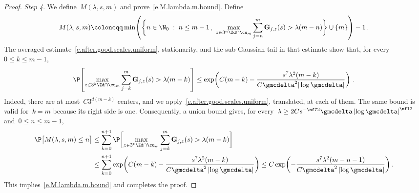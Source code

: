 \documentclass[11pt]{amsart}
\begin{document}
\begin{proof}
\emph{Step 4.} We define~$M(\lambda,s,m)$ and prove~\eqref{e.M.lambda.m.bound}. Define
\begin{align*}
	M(\lambda,s,m)
	\coloneqq
	\min\!\left(
	\biggl\{ n \in \N_0 \; : \;  n \leq m-1\,, \ \max_{z\in3^{n} \Zd \cap \cu_m}
	\sum_{j=n}^{m}
	\mathbf{G}_{j,z}(s)
	>
	\lambda (m-n)
	\biggr\}\cup\{m\}\right)-1
	\,.
\end{align*}
The averaged estimate~\eqref{e.after.good.scales.uniform}, stationarity, and the sub-Gaussian tail in that estimate show that, for every~$0\leq k\leq m-1$,
\begin{equation*}
	\P\!\left[
	\max_{z\in3^k\Zd\cap\cu_m}
	\sum_{j=k}^m\mathbf G_{j,z}(s)>\lambda(m-k)
	\right]
	\leq
	\exp\!\left(
	C(m-k)-\frac{s^7\lambda^2(m-k)}{C\gmcdelta^2|\log\gmcdelta|}
	\right)\,.
\end{equation*}
Indeed, there are at most~$C3^{d(m-k)}$ centers, and we apply~\eqref{e.after.good.scales.uniform}, translated, at each of them. The same bound is valid for~$k=m$ because its right side is one. Consequently, a union bound gives, for every~$\lambda \geq 2 Cs^{-\nf 72}   \gmcdelta \left| \log \gmcdelta \right|^{\nf 12} $ and~$0\leq n\leq m-1$,
\begin{align}
	\P \bigl[ M(\lambda,s,m) \leq n \bigr]
	&
	\leq
	\sum_{k=0}^{n+1}
	\P \biggl[
	\max_{z\in3^k \Zd \cap \cu_m}
	\sum_{j=k}^{m}
	\mathbf{G}_{j,z}(s)
	>
	\lambda (m-k)
	\biggr]
	\notag \\ &
	\leq
	\sum_{k=0}^{n+1}
	\exp \biggl( C (m-k)
	-\frac{s^7 \lambda^2  (m-k) }{C \gmcdelta^{2} \left| \log \gmcdelta \right| }
	\biggr)
	\leq
	C\exp \biggl(
	-\frac{s^7 \lambda^2  (m-n-1) }{C\gmcdelta^{2} \left| \log \gmcdelta \right|}
	\biggr)\,.
	\label{e.M.lambda.m.tail}
\end{align}
This implies~\eqref{e.M.lambda.m.bound} and completes the proof.
\end{proof}
\end{document}
